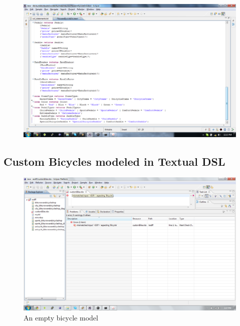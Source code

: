 \begin{figure}[H]
    \begin{center}
        \includegraphics[width=\textwidth]{fig/xtext/grammar_3.pdf}
    \end{center}
\end{figure}

\subsection{Custom Bicycles modeled in Textual DSL}

\begin{figure}[H]
    \begin{center}
        \includegraphics[width=\textwidth]{fig/xtext/xtext_example_empty_error.pdf}
        \caption{An empty bicycle model}
        \label{fig.dsl_empty_model}
    \end{center}
\end{figure}

